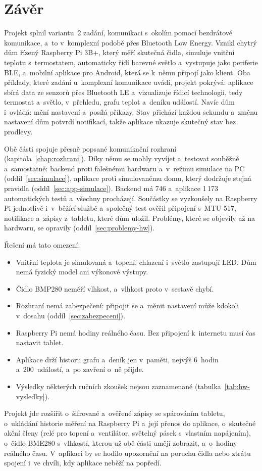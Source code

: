 \chapter{Závěr}
\label{chap:zaver}

Projekt splnil variantu~2 zadání, komunikaci s~okolím pomocí bezdrátové komunikace, a~to
v~komplexní podobě přes Bluetooth Low Energy. Vznikl chytrý dům řízený Raspberry Pi 3B+, který
měří skutečná čidla, simuluje vnitřní teplotu s~termostatem, automaticky řídí barevné světlo
a~vystupuje jako periferie BLE, a~mobilní aplikace pro Android, která se k~němu připojí jako
klient. Oba příklady, které zadání u~komplexní komunikace uvádí, projekt pokrývá: aplikace sbírá
data ze senzorů přes Bluetooth LE a~vizualizuje řídicí technologii, tedy termostat a~světlo,
v~přehledu, grafu teplot a~deníku událostí. Navíc dům i~ovládá: mění nastavení a~posílá příkazy.
Stav přichází každou sekundu a~změnu nastavení dům potvrdí notifikací, takže aplikace ukazuje
skutečný stav bez prodlevy.

Obě části spojuje přesně popsané komunikační rozhraní (kapitola~\ref{chap:rozhrani}). Díky němu
se mohly vyvíjet a~testovat souběžně a~samostatně: backend proti falešnému hardwaru
a~v~režimu simulace na PC (oddíl~\ref{sec:simulace}), aplikace proti simulovanému domu, který
dodržuje stejná pravidla (oddíl~\ref{sec:app-simulace}). Backend má 746 a~aplikace 1\,173
automatických testů a~všechny procházejí. Součástky se vyzkoušely na Raspberry Pi jednotlivě
i~v~běžící službě a~společný test ověřil připojení s~MTU 517, notifikace a~zápisy z~tabletu, které
dům uložil. Problémy, které se objevily až na hardwaru, se opravily (oddíl~\ref{sec:problemy-hw}).

Řešení má tato omezení:
\begin{itemize}
  \item Vnitřní teplota je simulovaná a~topení, chlazení i~světlo zastupují LED. Dům nemá
        fyzický model ani výkonové výstupy.
  \item Čidlo BMP280 neměří vlhkost, a~vlhkost proto v~sestavě chybí.
  \item Rozhraní nemá zabezpečení: připojit se a~měnit nastavení může kdokoli v~dosahu
        (oddíl~\ref{sec:zabezpeceni}).
  \item Raspberry Pi nemá hodiny reálného času. Bez připojení k~internetu musí čas nastavit tablet.
  \item Aplikace drží historii grafu a~deník jen v~paměti, nejvýš 6~hodin a~200~událostí, a~po
        zavření o~ně přijde.
  \item Výsledky některých ručních zkoušek nejsou zaznamenané (tabulka~\ref{tab:hw-vysledky}).
\end{itemize}

Projekt jde rozšířit o~šifrované a~ověřené zápisy se spárováním tabletu, o~ukládání historie
měření na Raspberry Pi a~její přenos do aplikace, o~skutečné akční členy (relé pro topení
a~ventilátor, světelný pásek s~vlastním napájením), o~čidlo BME280 s~vlhkostí, kterou už obě
části umějí zobrazit, a~o~hodiny reálného času. V~aplikaci by se hodilo upozornění na poruchu
čidla nebo ztrátu spojení i~ve chvíli, kdy aplikace neběží na popředí.
